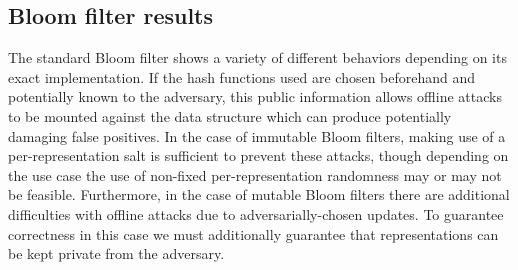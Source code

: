 


\subsection{Bloom filter results}
\label{subsec:bloom-filters}


%

The standard Bloom filter shows a variety of different behaviors depending on its exact implementation. If the hash functions used are chosen beforehand and potentially known to the adversary, this public information allows offline attacks to be mounted against the data structure which can produce potentially damaging false positives. In the case of immutable Bloom filters, making use of a per-representation salt is sufficient to prevent these attacks, though depending on the use case the use of non-fixed per-representation randomness may or may not be feasible. Furthermore, in the case of mutable Bloom filters there are additional difficulties with offline attacks due to adversarially-chosen updates. To guarantee correctness in this case we must additionally guarantee that representations can be kept private from the adversary.

